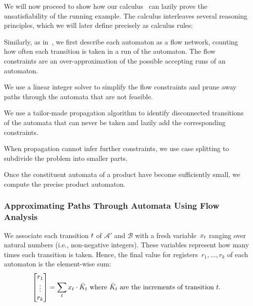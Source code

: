 We will now proceed to show how our calculus~\Calculus{} can lazily
prove the unsatisfiability of the running example. The calculus
interleaves several reasoning principles, which we will later
define precisely as calculus rules:
\begin{inparaenum}[(i)]
\item Similarly, as in~\cite{generate-parikh-image}, we first describe
  each automaton as a flow network, counting how often each transition
  is taken in a run of the automaton. The flow constraints are an
  over-approximation of the possible accepting runs of an automaton.
\item We use a linear integer solver to simplify the flow constraints
  and prune away paths through the automata that are not feasible.
\item We use a tailor-made propagation algorithm to identify disconnected
  transitions of the automata that can never be taken and lazily add
  the corresponding constraints.
\item When propagation cannot infer further constraints, we use case
  splitting to subdivide the problem into smaller parts.
\item Once the constituent automata of a product have become
  sufficiently small, we compute the precise product automaton.
\end{inparaenum}

\subsubsection{Approximating Paths Through Automata Using Flow Analysis}\label{sec:a_1}

We associate each transition $t$ of $\mathcal{A}'$ and $\mathcal{B}$ with a fresh
variable~$x_t$ ranging over natural numbers (i.e.,
non-negative integers).
These variables represent how many times each
transition is taken. Hence, the final value for registers~$r_1, \ldots,
r_k$ of each automaton is the element-wise sum:
\begin{equation}\label{eq:counter-sums}
\begin{bmatrix} 
  r_1 \\
  \vdots\\
  r_k \\
\end{bmatrix} = \sum_t x_t \cdot 
  \bar{K}_t \text{ where $\bar{K}_t$ are the increments of transition $t$}.
\end{equation}

